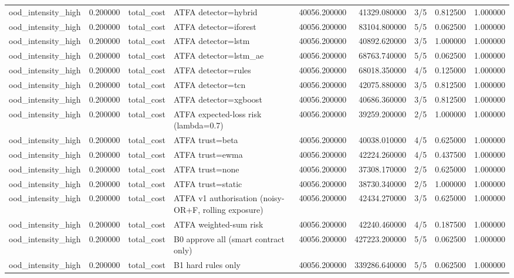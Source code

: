 \begin{tabular}{lrllrrlrr}
ood\_intensity\_high & 0.200000 & total\_cost & ATFA detector=hybrid & 40056.200000 & 41329.080000 & 3/5 & 0.812500 & 1.000000 \\
ood\_intensity\_high & 0.200000 & total\_cost & ATFA detector=iforest & 40056.200000 & 83104.800000 & 5/5 & 0.062500 & 1.000000 \\
ood\_intensity\_high & 0.200000 & total\_cost & ATFA detector=lstm & 40056.200000 & 40892.620000 & 3/5 & 1.000000 & 1.000000 \\
ood\_intensity\_high & 0.200000 & total\_cost & ATFA detector=lstm\_ae & 40056.200000 & 68763.740000 & 5/5 & 0.062500 & 1.000000 \\
ood\_intensity\_high & 0.200000 & total\_cost & ATFA detector=rules & 40056.200000 & 68018.350000 & 4/5 & 0.125000 & 1.000000 \\
ood\_intensity\_high & 0.200000 & total\_cost & ATFA detector=tcn & 40056.200000 & 42075.880000 & 3/5 & 0.812500 & 1.000000 \\
ood\_intensity\_high & 0.200000 & total\_cost & ATFA detector=xgboost & 40056.200000 & 40686.360000 & 3/5 & 0.812500 & 1.000000 \\
ood\_intensity\_high & 0.200000 & total\_cost & ATFA expected-loss risk (lambda=0.7) & 40056.200000 & 39259.200000 & 2/5 & 1.000000 & 1.000000 \\
ood\_intensity\_high & 0.200000 & total\_cost & ATFA trust=beta & 40056.200000 & 40038.010000 & 4/5 & 0.625000 & 1.000000 \\
ood\_intensity\_high & 0.200000 & total\_cost & ATFA trust=ewma & 40056.200000 & 42224.260000 & 4/5 & 0.437500 & 1.000000 \\
ood\_intensity\_high & 0.200000 & total\_cost & ATFA trust=none & 40056.200000 & 37308.170000 & 2/5 & 0.625000 & 1.000000 \\
ood\_intensity\_high & 0.200000 & total\_cost & ATFA trust=static & 40056.200000 & 38730.340000 & 2/5 & 1.000000 & 1.000000 \\
ood\_intensity\_high & 0.200000 & total\_cost & ATFA v1 authorisation (noisy-OR+F, rolling exposure) & 40056.200000 & 42434.270000 & 3/5 & 0.625000 & 1.000000 \\
ood\_intensity\_high & 0.200000 & total\_cost & ATFA weighted-sum risk & 40056.200000 & 42240.460000 & 4/5 & 0.187500 & 1.000000 \\
ood\_intensity\_high & 0.200000 & total\_cost & B0 approve all (smart contract only) & 40056.200000 & 427223.200000 & 5/5 & 0.062500 & 1.000000 \\
ood\_intensity\_high & 0.200000 & total\_cost & B1 hard rules only & 40056.200000 & 339286.640000 & 5/5 & 0.062500 & 1.000000 \\

\end{tabular}
